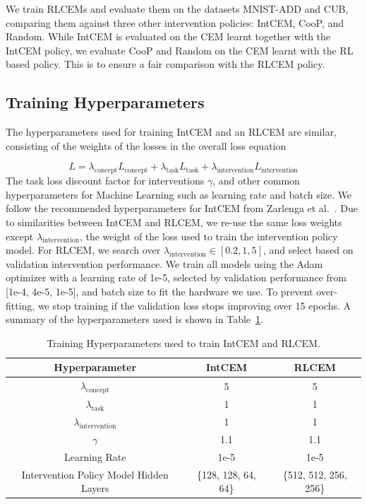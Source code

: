 We train RLCEMs and evaluate them on the datasets MNIST-ADD and CUB, 
comparing them against three other intervention policies:
IntCEM, CooP, and Random. While IntCEM is evaluated on the
CEM learnt together with the IntCEM policy,
we evaluate CooP and Random on the CEM learnt 
with the RL based policy. This is to ensure a fair comparison
with the RLCEM policy.

\subsection{Training Hyperparameters}

The hyperparameters used for training IntCEM and an RLCEM are similar,
consisting of the weights of the losses in the overall loss equation

\[L = \lambda_{\text{concept}} L_{\text{concept}}
+  \lambda_{\text{task}} L_{\text{task}}
+  \lambda_{\text{intervention}} L_{\text{intervention}}\]
The task loss discount factor for interventions $\gamma$,
and other common hyperparameters for Machine Learning such as learning rate
and batch size.
We follow the recommended hyperparameters 
for IntCEM from Zarlenga et al.~\cite{intcem}. 
Due 
to similarities between IntCEM and RLCEM, we re-use
the same loss weights except $\lambda_{\text{intervention}}$,
the weight of the loss used to train the intervention policy model.
For RLCEM, we search over $\lambda_{\text{intervention}} \in [0.2, 1, 5]$, and select based on validation
intervention performance.
We train all models using the Adam optimizer with a learning rate of 1e-5,
selected by validation performance from [1e-4, 4e-5, 1e-5], and 
batch size to fit the hardware we use.
To prevent over-fitting,
we stop training if the validation loss stops improving over 15 epochs.
A summary of the hyperparameters used is shown in 
Table~\ref{table:hyperparameters}.

\begin{table}[!ht]
    \centering
    \renewcommand{\arraystretch}{1.5}
    \begin{tabular}{c|cc}
        Hyperparameter & IntCEM & RLCEM \\
        \hline
        $\lambda_{\text{concept}}$ & 5 & 5\\
        $\lambda_{\text{task}}$ & 1 & 1\\
        $\lambda_{\text{intervention}}$ & 1 & 1\\
        $\gamma$ & 1.1 & 1.1 \\
        Learning Rate & 1e-5 & 1e-5  \\
        Intervention Policy Model Hidden Layers & \{128, 128, 64, 64\} & \{512, 512, 256, 256\} \\
    \end{tabular}
    \caption{Training Hyperparameters used to train IntCEM and RLCEM.}
    \label{table:hyperparameters}
\end{table}

